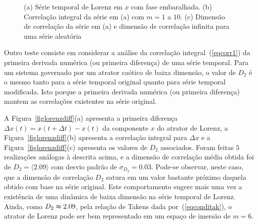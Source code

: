 \begin{figure}[ht]
\caption{(a) Série temporal de Lorenz em $x$ com fase embaralhada. (b) Correlação integral da série em (a) com $m=1$ a $10$. (c) Dimensão de correlação da série em (a) e dimensão de correlação infinita para uma série aleatória}
\label{figlorenzsurrogate}
\end{figure}

Outro teste consiste em considerar a análise da correlação integral~(\ref{eqcorr1}) da primeira derivada numérica (ou primeira diferença) de uma série temporal. Para um sistema governado por um atrator caótico de baixa dimensão, o valor de $D_{2}$ é o mesmo tanto para a série temporal original quanto para série temporal modificada. Isto porque a primeira derivada numérica (ou primeira diferença) mantem as correlações existentes na série original. 

A Figura~\ref{figlorenzdiff}(a) apresenta a primeira diferença $\Delta x(t)=x(t+\Delta t)-x(t)$ da componente $x$ do atrator de Lorenz, a Figura~\ref{figlorenzdiff}(b) apresenta a correlação integral para $\Delta x$ e a Figura~\ref{figlorenzdiff}(c) apresenta os valores de $D_{2}$ associados. Foram feitas $5$ realizações análogas à descrita acima, e a dimensão de correlação média obtida foi de $D_{2}=\langle2.09\rangle$ com desvio padrão de $\sigma_{D_{2}}=0.03$. Pode-se observar, neste caso, que a dimensão de correlação $D_{2}$ satura em um valor bastante próximo daquela obtido com base na série original. Este comportamento sugere mais uma vez a existência de uma dinâmica de baixa dimensão na série temporal de Lorenz. Ainda, como $D_{2}\thickapprox 2.09$, pela relação de Takens dada por~(\ref{eqconditak}), o atrator de Lorenz pode ser bem representado em um espaço de imersão de $m=6$.

